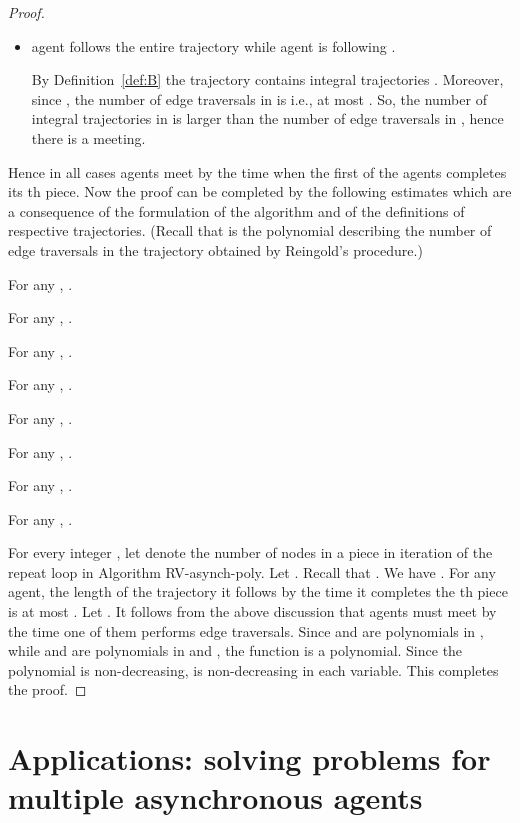 \documentclass [11pt] {article}
\begin{document}
\begin{proof}
\begin{itemize}
The trajectory  consists of repetitions of {} for some node .  Since by Lemma \ref{claim1}, , the trajectory
, contains   for every node  of the graph, which implies a meeting by Lemma \ref{tunel}.

\item agent  follows the entire trajectory  while agent  is following . 

By Definition~\ref{def:B} the trajectory  contains  integral trajectories . Moreover, since , the number of {edge traversals} in  is  i.e., at most . So, the number of integral trajectories  in  is larger than the number of {edge traversals} in , hence there is a meeting.
\end{itemize}

{Hence in all cases agents meet by the time when the first of the agents completes its th piece}. Now the proof can be completed by the following estimates which are a consequence of the formulation of the algorithm and of the definitions of respective trajectories.
 (Recall that  is the
polynomial describing the number of edge traversals in the trajectory obtained by Reingold's procedure.)


For any , .

For any , .

For any , .

For any , .

For any , .

{For any , .}

{For any , .}

For any , .

For every integer , let  denote the number of nodes in a piece in iteration  of the repeat loop in Algorithm RV-asynch-poly. Let . Recall that . 
 We have .
 {For any agent, the length of the trajectory it follows by the time it
 completes the th piece is at most .} Let .
It follows from the above discussion that agents must meet by the time one of them performs  edge traversals.
 Since  and  are polynomials in , while  and  are polynomials in  and , the function  is a polynomial.
Since the polynomial  is non-decreasing,  is non-decreasing in each variable. This completes the proof.
\end{proof}

\section{Applications: solving problems for multiple asynchronous agents}
\end{document}
